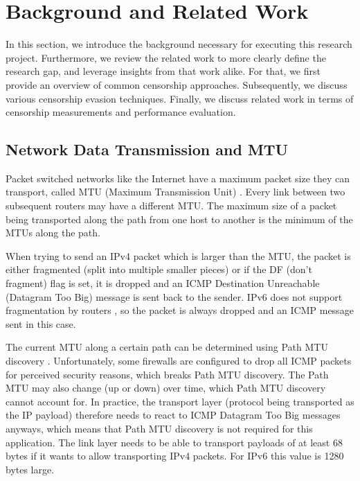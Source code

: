 
\chapter{Background and Related Work}
\label{chap:background}

In this section, we introduce the background necessary for executing this research project.
Furthermore, we review the related work to more clearly define the research gap, and leverage insights from that work alike.
For that, we first provide an overview of common censorship approaches.
Subsequently, we discuss various censorship evasion techniques.
Finally, we discuss related work in terms of censorship measurements and performance evaluation.

\section{Network Data Transmission and MTU}
Packet switched networks like the Internet have a maximum packet size they can transport, called MTU (Maximum Transmission Unit) \cite{RFC0791}.
Every link between two subsequent routers may have a different MTU.
The maximum size of a packet being transported along the path from one host to another is the minimum of the MTUs along the path.

When trying to send an IPv4 packet which is larger than the MTU, the packet is either fragmented (split into multiple smaller pieces) or if the DF (don't fragment) flag is set, it is dropped and an ICMP Destination Unreachable (Datagram Too Big) message is sent back to the sender.
IPv6 does not support fragmentation by routers \cite{RFC8200}, so the packet is always dropped and an ICMP message sent in this case.

The current MTU along a certain path can be determined using Path MTU discovery \cite{RFC1191}.
Unfortunately, some firewalls are configured to drop all ICMP packets for perceived security reasons, which breaks Path MTU discovery.
The Path MTU may also change (up or down) over time, which Path MTU discovery cannot account for.
In practice, the transport layer (protocol being transported as the IP payload) therefore needs to react to ICMP Datagram Too Big messages anyways, which means that Path MTU discovery is not required for this application.
The link layer needs to be able to transport payloads of at least 68 bytes if it wants to allow transporting IPv4 packets.
For IPv6 this value is 1280 bytes large.

